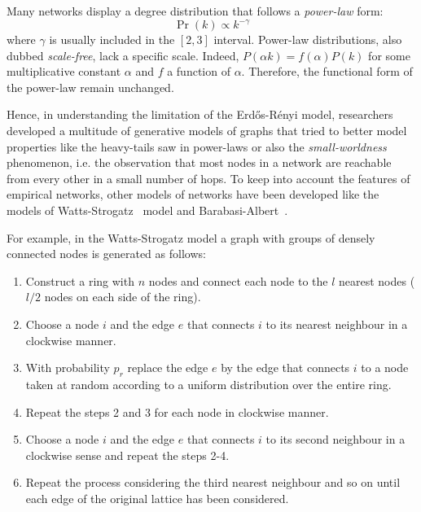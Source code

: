 Many networks display a degree distribution that follows a \emph{power-law} form:
\begin{equation}
\Pr(k) \propto k^{-\gamma}
\end{equation}
where $\gamma$ is usually included in the $[2,3]$ interval.
Power-law distributions, also dubbed \emph{scale-free}, lack a specific scale.
Indeed, $P(\alpha k)=f(\alpha)P(k)$ for some multiplicative constant $\alpha$  and $f$ a function of $\alpha$.
Therefore, the functional form of the power-law remain unchanged.

Hence, in understanding the limitation of the Erd\H{o}s-Rényi model, researchers developed a multitude of generative models of graphs that tried to better model properties like the heavy-tails saw in power-laws or also the \emph{small-worldness} phenomenon, i.e.
the observation that most nodes in a network are reachable from every other in a small number of hops.
To keep into account the features of empirical networks, other models of networks have been developed like the models of Watts-Strogatz~\cite{watts1998} model and Barabasi-Albert~\cite{barabasi1999}.

For example, in the Watts-Strogatz model a graph with groups of densely connected nodes is generated as follows:
\begin{enumerate}
\item Construct a ring with $n$ nodes and connect each node to the $l$ nearest nodes ($l/2$ nodes on each side of the ring).
\item Choose a node $i$ and the edge $e$ that connects $i$ to its nearest neighbour in a clockwise manner.
\item With probability $p_r$ replace the edge $e$ by the edge that connects $i$ to a node taken at random according to a uniform distribution over the entire ring.
\item Repeat the steps 2 and 3 for each node in clockwise manner.
\item Choose a node $i$ and the edge $e$ that connects $i$ to its second neighbour in a clockwise sense and repeat the steps 2-4.
\item Repeat the process considering the third nearest neighbour and so on until each edge of the original lattice has been considered.
\end{enumerate}

